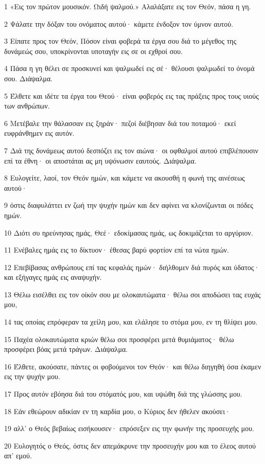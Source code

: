 \par 1 «Εις τον πρώτον μουσικόν. Ωιδή ψαλμού.» Αλαλάξατε εις τον Θεόν, πάσα η γη.
\par 2 Ψάλατε την δόξαν του ονόματος αυτού· κάμετε ένδοξον τον ύμνον αυτού.
\par 3 Είπατε προς τον Θεόν, Πόσον είναι φοβερά τα έργα σου διά το μέγεθος της δυνάμεώς σου, υποκρίνονται υποταγήν εις σε οι εχθροί σου.
\par 4 Πάσα η γη θέλει σε προσκυνεί και ψαλμωδεί εις σέ· θέλουσι ψαλμωδεί το όνομά σου. Διάψαλμα.
\par 5 Έλθετε και ιδέτε τα έργα του Θεού· είναι φοβερός εις τας πράξεις προς τους υιούς των ανθρώπων.
\par 6 Μετέβαλε την θάλασσαν εις ξηράν· πεζοί διέβησαν διά του ποταμού· εκεί ευφράνθημεν εις αυτόν.
\par 7 Διά της δυνάμεως αυτού δεσπόζει εις τον αιώνα· οι οφθαλμοί αυτού επιβλέπουσιν επί τα έθνη· οι αποστάται ας μη υψόνωσιν εαυτούς. Διάψαλμα.
\par 8 Ευλογείτε, λαοί, τον Θεόν ημών, και κάμετε να ακουσθή η φωνή της αινέσεως αυτού·
\par 9 όστις διαφυλάττει εν ζωή την ψυχήν ημών και δεν αφίνει να κλονίζωνται οι πόδες ημών.
\par 10 Διότι συ ηρεύνησας ημάς, Θεέ· εδοκίμασας ημάς, ως δοκιμάζεται το αργύριον.
\par 11 Ενέβαλες ημάς εις το δίκτυον· έθεσας βαρύ φορτίον επί τα νώτα ημών.
\par 12 Επεβίβασας ανθρώπους επί τας κεφαλάς ημών· διήλθομεν διά πυρός και ύδατος· και εξήγαγες ημάς εις αναψυχήν.
\par 13 Θέλω εισέλθει εις τον οίκόν σου με ολοκαυτώματα· θέλω σοι αποδώσει τας ευχάς μου,
\par 14 τας οποίας επρόφεραν τα χείλη μου, και ελάλησε το στόμα μου, εν τη θλίψει μου.
\par 15 Παχέα ολοκαυτώματα κριών θέλω σοι προσφέρει μετά θυμιάματος· θέλω προσφέρει βόας μετά τράγων. Διάψαλμα.
\par 16 Έλθετε, ακούσατε, πάντες οι φοβούμενοι τον Θεόν· και θέλω διηγηθή όσα έκαμεν εις την ψυχήν μου.
\par 17 Προς αυτόν εβόησα διά του στόματός μου, και υψώθη διά της γλώσσης μου.
\par 18 Εάν εθεώρουν αδικίαν εν τη καρδία μου, ο Κύριος δεν ήθελεν ακούσει·
\par 19 αλλ' ο Θεός βεβαίως εισήκουσεν· επρόσεξεν εις την φωνήν της προσευχής μου.
\par 20 Ευλογητός ο Θεός, όστις δεν απεμάκρυνε την προσευχήν μου και το έλεος αυτού απ' εμού.


